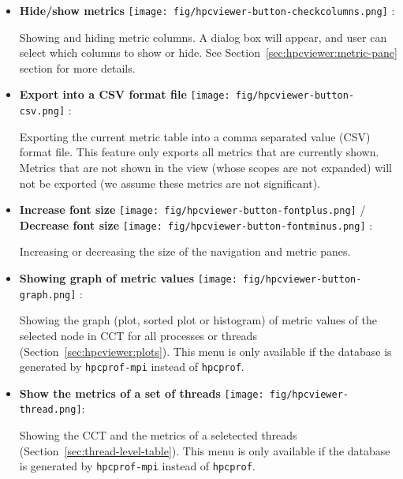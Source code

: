 \begin{itemize}
\item \textbf{Hide/show metrics} \texttt{[image: fig/hpcviewer-button-checkcolumns.png]} :

Showing and hiding metric columns.
A dialog box will appear, and user can select which columns to show or hide.
See Section~\ref{sec:hpcviewer:metric-pane} section for more details.

\item \textbf{Export into a CSV format file} \texttt{[image: fig/hpcviewer-button-csv.png]} :

Exporting the current metric table into a comma separated value (CSV) format file.
This feature only exports all metrics that are currently shown.
Metrics that are not shown in the view (whose scopes are not expanded) will not be exported (we assume these metrics are not significant).

\item \textbf{Increase font size} \texttt{[image: fig/hpcviewer-button-fontplus.png]} /
      \textbf{Decrease font size} \texttt{[image: fig/hpcviewer-button-fontminus.png]} :

Increasing or decreasing the size of the navigation and metric panes.

\item \textbf{Showing graph of metric values} \texttt{[image: fig/hpcviewer-button-graph.png]} :

Showing the graph (plot, sorted plot or histogram) of metric values of the selected node in CCT for all processes or threads (Section~\ref{sec:hpcviewer:plots}). 
This menu is only available if the database is generated by \texttt{hpcprof-mpi} instead of \texttt{hpcprof}. 

\item \textbf{Show the metrics of a set of threads} \texttt{[image: fig/hpcviewer-thread.png]}:

Showing the CCT and the metrics of a seletected threads  (Section~\ref{sec:thread-level-table}). 
This menu is only available if the database is generated by \texttt{hpcprof-mpi} instead of \texttt{hpcprof}. 
 
\end{itemize}


